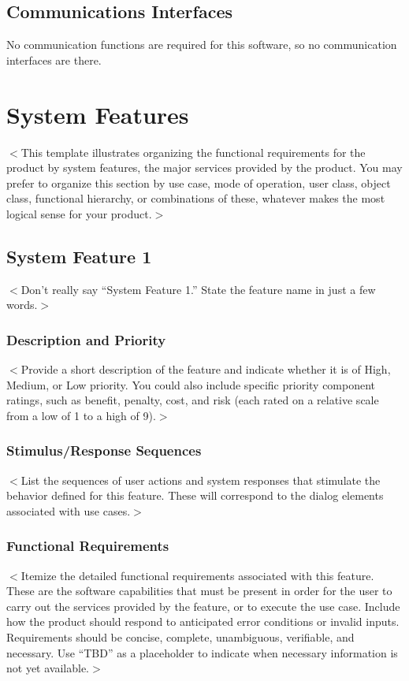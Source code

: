 \documentclass{scrreprt}
\begin{document}
\section{Communications Interfaces}
No communication functions are required for this software, so no communication interfaces are there.


\chapter{System Features}
$<$This template illustrates organizing the functional requirements for the 
product by system features, the major services provided by the product. You may 
prefer to organize this section by use case, mode of operation, user class, 
object class, functional hierarchy, or combinations of these, whatever makes the 
most logical sense for your product.$>$

\section{System Feature 1}
$<$Don’t really say “System Feature 1.” State the feature name in just a few 
words.$>$

\subsection{Description and Priority}
$<$Provide a short description of the feature and indicate whether it is of 
High, Medium, or Low priority. You could also include specific priority 
component ratings, such as benefit, penalty, cost, and risk (each rated on a 
relative scale from a low of 1 to a high of 9).$>$

\subsection{Stimulus/Response Sequences}
$<$List the sequences of user actions and system responses that stimulate the 
behavior defined for this feature. These will correspond to the dialog elements 
associated with use cases.$>$

\subsection{Functional Requirements}
$<$Itemize the detailed functional requirements associated with this feature.  
These are the software capabilities that must be present in order for the user 
to carry out the services provided by the feature, or to execute the use case.  
Include how the product should respond to anticipated error conditions or 
invalid inputs. Requirements should be concise, complete, unambiguous, 
verifiable, and necessary. Use “TBD” as a placeholder to indicate when necessary 
information is not yet available.$>$
\end{document}
